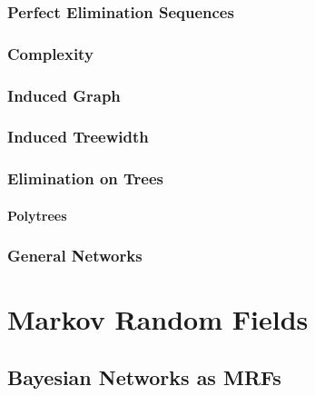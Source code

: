         \subsection{Perfect Elimination Sequences} %

        \subsection{Complexity} %

        \subsection{Induced Graph} %

        \subsection{Induced Treewidth} %

        \subsection{Elimination on Trees} %

            \subsubsection{Polytrees} %

        \subsection{General Networks} %

\chapter{Markov Random Fields} %

    \section{Bayesian Networks as MRFs} %

